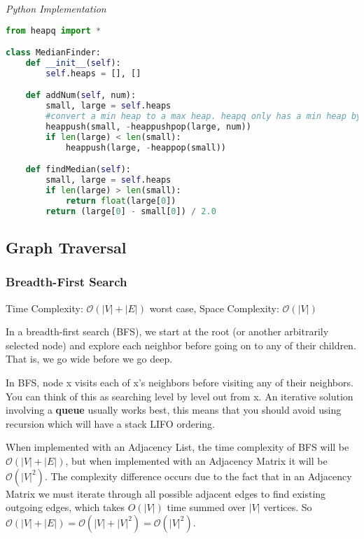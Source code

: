 \documentclass{article}
\newcommand{\bigO}{\mathcal{O}}
\begin{document}
\vspace{8pt} \emph{Python Implementation}
\begin{lstlisting}[language=Python]
from heapq import *

class MedianFinder:
    def __init__(self):
        self.heaps = [], []

    def addNum(self, num):
        small, large = self.heaps
        #convert a min heap to a max heap. heapq only has a min heap by default.
        heappush(small, -heappushpop(large, num))
        if len(large) < len(small):
            heappush(large, -heappop(small))

    def findMedian(self):
        small, large = self.heaps
        if len(large) > len(small):
            return float(large[0])
        return (large[0] - small[0]) / 2.0
\end{lstlisting}

    \subsection{Graph Traversal}
    
    \subsubsection{Breadth-First Search}
    Time Complexity: $\bigO(|V| + |E|)$ worst case, Space Complexity: $\bigO(|V|)$
    
    In a breadth-first search (BFS), we start at the root (or another arbitrarily selected node) and explore each neighbor before going on to any of their children. That is, we go wide before we go deep. 
    
    In BFS, node x visits each of x's neighbors before visiting any of their neighbors. You can think of this as searching level by level out from x. An iterative solution involving a \textbf{queue} usually works best, this means that you should avoid using recursion which will have a stack LIFO ordering.
    
    When implemented with an Adjacency List, the time complexity of BFS will be $\bigO(|V| + |E|)$, but when implemented with an Adjacency Matrix it will be $\bigO(|V|^2)$. The complexity difference occurs due to the fact that in an Adjacency Matrix we must iterate through all possible adjacent edges to find existing outgoing edges, which takes $O(|V|)$ time summed over $|V|$ vertices. So $\bigO(|V| + |E|) = \bigO(|V| + |V|^2) = \bigO(|V|^2)$.
    
\end{document}
